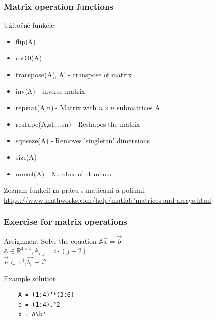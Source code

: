 \documentclass{beamer}
\begin{document}
\begin{frame}[fragile]
\frametitle{Matrix operation functions}

  
  \begin{block}{Užitočné funkcie}
  \begin{itemize}
    \item flip(A)
    \item rot90(A)
    \item transpose(A), A' - transpose of matrix
    \item inv(A) - inverse matrix
    \item repmat(A,n) - Matrix with $n \times n$ submatrices A 
    \item reshape(A,s1,..,sn) - Reshapes the matrix
    \item squeeze(A) - Removes 'singleton' dimensions 
    \item size(A) 
    \item numel(A) - Number of elements
  \end{itemize}
  \end{block}
  
  Zoznam funkcií na prácu s maticami a poliami: \\
  \url{https://www.mathworks.com/help/matlab/matrices-and-arrays.html}  
\end{frame}

\begin{frame}[fragile]
\frametitle{Exercise for matrix operations}
  
  \begin{block}{Assignment}
  \centering
    Solve the equation $\mathbb{A}\vec{x} = \vec{b}$ \\
    $\mathbb{A} \in \mathbb{R}^{4\times4}, \mathbb{A}_{i,j} = i\cdot (j + 2)$ \\
    $\vec{b} \in \mathbb{R}^4, \vec{b_i} = i^2$
  \end{block}
  
  \pause
  
  \begin{block}{Example solution}
  \begin{verbatim}
    A = (1:4)'*(3:6)
    b = (1:4).^2
    x = A\b'  \end{verbatim}
  \end{block}  
\end{frame}
\end{document}

